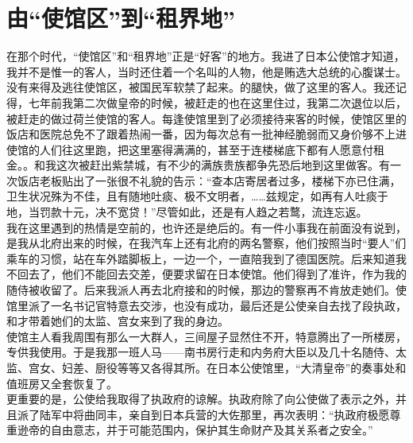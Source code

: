 \fancyhead[RO]{} %
\fancyhead[LE]{} %
\chapter*{由“使馆区”到“租界地”}
\thispagestyle{empty}
在那个时代，“使馆区”和“租界地”正是“好客”的地方。我进了日本公使馆才知道，我并不是惟一的客人，当时还住着一个名叫的人物，他是贿选大总统的心腹谋士。没有来得及逃往使馆区，被国民军软禁了起来。的腿快，做了这里的客人。我还记得，七年前我第二次做皇帝的时候，被赶走的也在这里住过，我第二次退位以后，被赶走的做过荷兰使馆的客人。每逢使馆里到了必须接待来客的时候，使馆区里的饭店和医院总免不了跟着热闹一番，因为每次总有一批神经脆弱而又身价够不上进使馆的人们往这里跑，把这里塞得满满的，甚至于连楼梯底下都有人愿意付租金。。和我这次被赶出紫禁城，有不少的满族贵族都争先恐后地到这里做客。有一次饭店老板贴出了一张很不礼貌的告示：“查本店寄居者过多，楼梯下亦已住满，卫生状况殊为不佳，且有随地吐痰、极不文明者，……兹规定，如再有人吐痰于地，当罚款十元，决不宽贷！”尽管如此，还是有人趋之若鹜，流连忘返。\\

我在这里遇到的热情是空前的，也许还是绝后的。有一件小事我在前面没有说到，是我从北府出来的时候，在我汽车上还有北府的两名警察，他们按照当时“要人”们乘车的习惯，站在车外踏脚板上，一边一个，一直陪我到了德国医院。后来知道我不回去了，他们不能回去交差，便要求留在日本使馆。他们得到了准许，作为我的随侍被收留了。后来我派人再去北府接和的时候，那边的警察再不肯放走她们。使馆里派了一名书记官特意去交涉，也没有成功，最后还是公使亲自去找了段执政，和才带着她们的太监、宫女来到了我的身边。\\

使馆主人看我周围有那么一大群人，三间屋子显然住不开，特意腾出了一所楼房，专供我使用。于是我那一班人马——南书房行走和内务府大臣以及几十名随侍、太监、宫女、妇差、厨役等等又各得其所。在日本公使馆里，“大清皇帝”的奏事处和值班房又全套恢复了。\\

更重要的是，公使给我取得了执政府的谅解。执政府除了向公使做了表示之外，并且派了陆军中将曲同丰，亲自到日本兵营的大佐那里，再次表明：“执政府极愿尊重逊帝的自由意志，并于可能范围内，保护其生命财产及其关系者之安全。”\\

